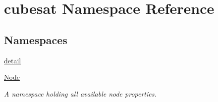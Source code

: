 \hypertarget{namespacecubesat}{}\section{cubesat Namespace Reference}
\label{namespacecubesat}
\subsection*{Namespaces}
\begin{DoxyCompactItemize}
\item 
 \hyperlink{namespacecubesat_1_1detail}{detail}
\item 
 \hyperlink{namespacecubesat_1_1Node}{Node}
\begin{DoxyCompactList}\small\item\em A namespace holding all available node properties. \end{DoxyCompactList}\end{DoxyCompactItemize}
